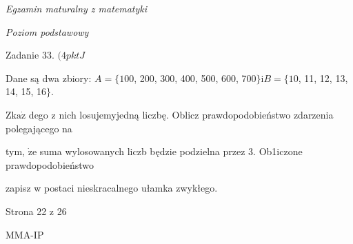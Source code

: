\documentclass[a4paper,12pt]{article}
\begin{document}
{\it Egzamin maturalny z matematyki}

{\it Poziom podstawowy}

Zadanie 33. $(4pktJ$

Dane są dwa zbiory: $A=\{100$, 200, 300, 400, 500, 600, 700$\} \mathrm{i} B=\{10$, 11, 12, 13, 14, 15, 16$\}.$

$\mathrm{Z}\mathrm{k}\mathrm{a}\dot{\mathrm{z}}$ dego z nich losujemyjedną liczbę. Oblicz prawdopodobieństwo zdarzenia polegającego na

tym, $\dot{\mathrm{z}}\mathrm{e}$ suma wylosowanych liczb będzie podzielna przez 3. Ob1iczone prawdopodobieństwo

zapisz w postaci nieskracalnego ułamka zwykłego.

Strona 22 z 26

MMA-IP
\end{document}
